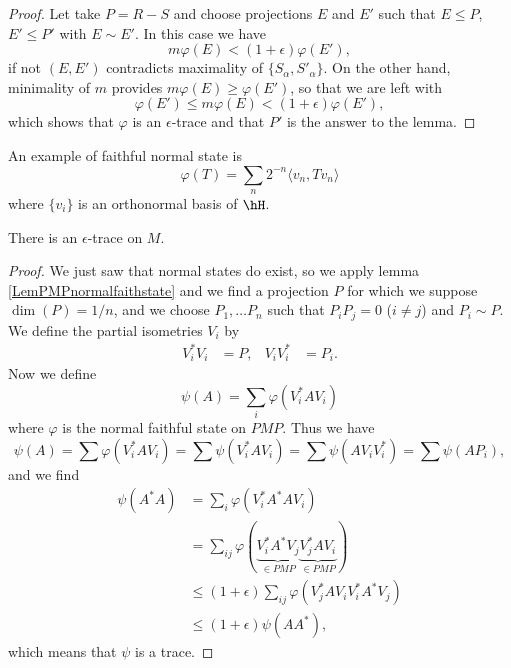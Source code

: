 \begin{proof}
Let take $P=R-S$ and choose projections $E$ and $E'$ such that $E\leq P$, $E'\leq P'$ with $E\sim E'$. In this case we have 
\[ 
	m\varphi(E)<(1+\epsilon)\varphi(E'),
\]
if not $(E,E')$ contradicts maximality of $\{ S_{\alpha},S'_{\alpha} \}$. On the other hand, minimality of $m$ provides $m\varphi(E)\geq \varphi(E')$, so that we are left with
\begin{equation}
	\varphi(E')\leq m\varphi(E)<(1+\epsilon)\varphi(E'),
\end{equation}
which shows that $\varphi$ is an $\epsilon$-trace and that $P'$ is the answer to the lemma.

\end{proof}

An example of faithful normal state is
\begin{equation}
	\varphi(T)=\sum_n2^{-n}\langle v_n, Tv_n\rangle 
\end{equation}
where $\{ v_i \}$ is an orthonormal basis of $\hH$.

\begin{proposition}
There is an $\epsilon$-trace on $M$.
\end{proposition}

\begin{proof}
We just saw that normal states do exist, so we apply lemma \ref{LemPMPnormalfaithstate} and we find a projection $P$ for which we suppose $\dim(P)=1/n$, and we choose $P_1,\ldots P_n$ such that $P_iP_j=0$ ($i\neq j$) and $P_i\sim P$. We define the partial isometries $V_i$ by
\begin{align*}
	V_i^*V_i&=P,&V_iV_i^*&=P_i.
\end{align*}
Now we define 
\[ 
	\psi(A)=\sum_i\varphi(V_i^*AV_i)
\]
where $\varphi$ is the normal faithful state on $PMP$. Thus we have
\[ 
	\psi(A)=\sum\varphi(V_i^*AV_i)=\sum\psi(V_i^*AV_i)=\sum\psi(AV_iV_i^*)=\sum\psi(AP_i),
\]
and we find
\begin{equation}
\begin{split}
	\psi(A^*A)	&=\sum_i\varphi(V_i^*A^*AV_i)\\
			&=\sum_{ij}\varphi(\underbrace{V_i^*A^*V_j}_{\in PMP}\underbrace{V_j^*AV_i}_{\in PMP})\\
			&\leq(1+\epsilon)\sum_{ij}\varphi(V_j^*AV_iV_i^*A^*V_j)\\
			&\leq (1+\epsilon)\psi(AA^*),
\end{split}
\end{equation}
which means that $\psi$ is a trace.
\end{proof}

